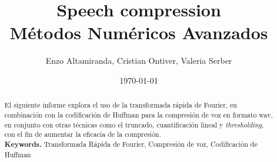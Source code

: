 \documentclass[a4paper,11pt]{article}
\title{Speech compression \\
M\'etodos Num\'ericos Avanzados}
\author{Enzo Altamiranda, Cristian Ontiver, Valeria Serber}
\date{\today}
\begin{document}
\maketitle
\thispagestyle{empty}
\vspace{3cm}

\renewcommand{\abstractname}{Resumen}
\begin{abstract}
El siguiente informe explora el uso de la transformada rápida de Fourier, en
combinación con la codificación de Huffman para la compresión de voz en formato
wav, en conjunto con otras técnicas como el truncado, cuantificación lineal y
\textit{thresholding}, con el fin de aumentar la eficacia de la compresión.
\\[5pt]
\noindent \textbf{Keywords.} Transformada Rápida de Fourier, Compresión de voz, Codificación de Huffman
\end{abstract}
\newpage
\end{document}
